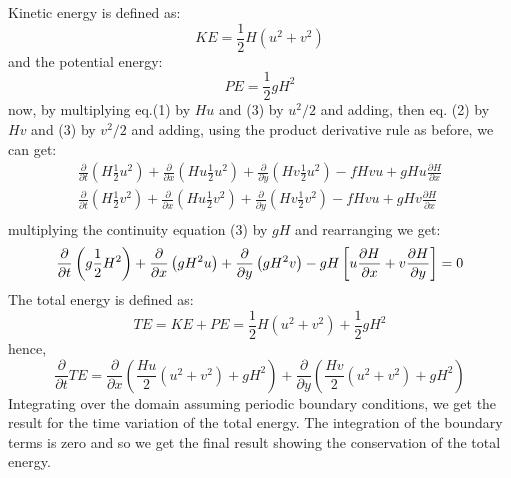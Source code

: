 Kinetic energy is defined as:
$$KE=\frac{1}{2}H(u^2+v^2)$$
and the potential energy:
$$PE=\frac{1}{2}gH^2$$
now, by multiplying eq.(1) by $Hu$ and (3) by $u^2/2$ and adding, then eq. (2) by $Hv$ and (3) by $v^2/2$ and adding, using the product derivative rule as before, we can get:
\begin{align}
	\frac{\partial}{\partial t}\left(H\frac{1}{2}u^2\right)+\frac{\partial}{\partial x}\left(Hu\frac{1}{2}u^2\right)+\frac{\partial}{\partial y}\left(Hv\frac{1}{2}u^2\right)-fHvu+gHu\frac{\partial H}{\partial x} \\
	\frac{\partial}{\partial t}\left(H\frac{1}{2}v^2\right)+\frac{\partial}{\partial x}\left(Hu\frac{1}{2}v^2\right)+\frac{\partial}{\partial y}\left(Hv\frac{1}{2}v^2\right)-fHvu+gHv\frac{\partial H}{\partial x} \\
\end{align}
multiplying the continuity equation (3) by $gH$ and rearranging we get:
\begin{equation}
	\frac{\partial}{\partial t}\left(g\frac{1}{2}H^2\right)+\frac{\partial}{\partial x}\left(gH^2u\right)+\frac{\partial}{\partial y}\left(gH^2v\right)-gH\left[u\frac{\partial H}{\partial x}+v\frac{\partial H}{\partial y}\right]=0\\
\end{equation}
The total energy is defined as:
$$TE=KE+PE=\frac{1}{2}H(u^2+v^2)+\frac{1}{2}gH^2$$
hence,
\begin{equation}
	\frac{\partial}{\partial t}TE=\frac{\partial }{\partial x}\left(\frac{Hu}{2}(u^2+v^2)+gH^2\right)+\frac{\partial}{\partial y}\left(\frac{Hv}{2}(u^2+v^2)+gH^2\right)
\end{equation}
Integrating over the domain assuming periodic boundary conditions, we get the result for the time variation of the total energy. The integration of the boundary terms is zero and so we get the final result showing the conservation of the total energy.
